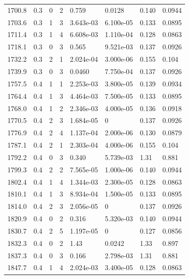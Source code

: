 \documentclass[preview]{standalone}
\begin{document}
{{{{{{\begin{tabular}{L{1.2cm}C{1.2cm} C{0.3cm}C{0.5cm} C{1.4cm}C{1.4cm} C{1.4cm}C{1.4cm}}
  1700.8  &   0.3  & 0     &  2 &  0.759  & 0.0128  & 0.140 &  0.0944   \\ 
  1703.6  &   0.3  & 1     &  3 &  3.643e-03  & 6.100e-05  & 0.133 &  0.0895   \\ 
  1711.4  &   0.3  & 1     &  4 &  6.608e-03  & 1.110e-04  & 0.128 &  0.0863   \\ 
  1718.1  &   0.3  & 0     &  3 &  0.565  & 9.521e-03  & 0.137 &  0.0926   \\ 
  1732.2  &   0.3  & 2     &  1 &  2.024e-04  & 3.000e-06  & 0.155 &  0.104   \\ 
  1739.9  &   0.3  & 0     &  3 &  0.0460  & 7.750e-04  & 0.137 &  0.0926   \\ 
  1757.5  &   0.4  & 1     &  1 &  2.253e-03  & 3.800e-05  & 0.139 &  0.0934   \\ 
  1764.4  &   0.4  & 1     &  3 &  4.464e-03  & 7.500e-05  & 0.133 &  0.0895   \\ 
  1768.0  &   0.4  & 1     &  2 &  2.346e-03  & 4.000e-05  & 0.136 &  0.0918   \\ 
  1770.5  &   0.4  & 2     &  3 &  1.684e-05  & 0  & 0.137 &  0.0926   \\ 
  1776.9  &   0.4  & 2     &  4 &  1.137e-04  & 2.000e-06  & 0.130 &  0.0879   \\ 
  1787.1  &   0.4  & 2     &  1 &  2.303e-04  & 4.000e-06  & 0.155 &  0.104   \\ 
  1792.2  &   0.4  & 0     &  3 &  0.340  & 5.739e-03  & 1.31 &  0.881   \\ 
  1799.3  &   0.4  & 2     &  2 &  7.565e-05  & 1.000e-06  & 0.140 &  0.0944   \\ 
  1802.4  &   0.4  & 1     &  4 &  1.344e-03  & 2.300e-05  & 0.128 &  0.0863   \\ 
  1810.1  &   0.4  & 1     &  3 &  8.934e-04  & 1.500e-05  & 0.133 &  0.0895   \\ 
  1814.0  &   0.4  & 2     &  3 &  2.056e-05  & 0  & 0.137 &  0.0926   \\ 
  1820.9  &   0.4  & 0     &  2 &  0.316  & 5.320e-03  & 0.140 &  0.0944   \\ 
  1830.7  &   0.4  & 2     &  5 &  1.197e-05  & 0  & 0.127 &  0.0856   \\ 
  1832.3  &   0.4  & 0     &  2 &  1.43  & 0.0242  & 1.33 &  0.897   \\ 
  1837.3  &   0.4  & 0     &  3 &  0.166  & 2.798e-03  & 1.31 &  0.881   \\ 
  1847.7  &   0.4  & 1     &  4 &  2.024e-03  & 3.400e-05  & 0.128 &  0.0863   \\ 

\end{tabular}}}}}}}
\end{document}
